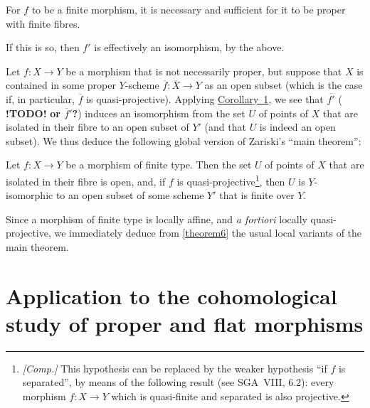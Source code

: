 \documentclass{article}
\theoremstyle{plain}
\newenvironment{theorem}[1]
  {\renewcommand\theinnercustomtheorem{#1}\innercustomtheorem}
  {\endinnercustomtheorem}
\newenvironment{corollary}[1]
  {\renewcommand\theinnercustomcorollary{#1}\innercustomcorollary}
  {\endinnercustomcorollary}
\theoremstyle{definition}
\newcommand{\todo}{\textbf{ !TODO! }}
\begin{document}
\begin{corollary}{2}
\label{theorem5corollary2}
  For $f$ to be a finite morphism, it is necessary and sufficient for it to be proper with finite fibres.
\end{corollary}

If this is so, then $f'$ is effectively an isomorphism, by the above.

Let $f\colon X\to Y$ be a morphism that is not necessarily proper, but suppose that $X$ is contained in some proper $Y$-scheme $\overline{f}\colon\overline{X}\to Y$ as an open subset (which is the case if, in particular, $\overline{f}$ is quasi-projective).
Applying \hyperref[theorem5corollary1]{Corollary~1}, we see that $\overline{f'}$ (\todo \textbf{or $\overline{f}'$?}) induces an isomorphism from the set $U$ of points of $X$ that are isolated in their fibre to an open subset of $Y'$ (and that $U$ is indeed an open subset).
We thus deduce the following global version of Zariski's ``main theorem'':

\begin{theorem}{6}
\label{theorem6}
  Let $f\colon X\to Y$ be a morphism of finite type.
  Then the set $U$ of points of $X$ that are isolated in their fibre is open, and, if $f$ is quasi-projective\footnote{\emph{[Comp.]} This hypothesis can be replaced by the weaker hypothesis ``if $f$ is separated'', by means of the following result (see SGA~VIII, 6.2): every morphism $f\colon X\to Y$ which is quasi-finite and separated is also projective.}, then $U$ is $Y$-isomorphic to an open subset of some scheme $Y'$ that is finite over $Y$.
\end{theorem}

Since a morphism of finite type is locally affine, and \emph{a fortiori} locally quasi-projective, we immediately deduce from \cref{theorem6} the usual local variants of the main theorem.


\section{Application to the cohomological study of proper and flat morphisms}
\label{section5}
\end{document}
